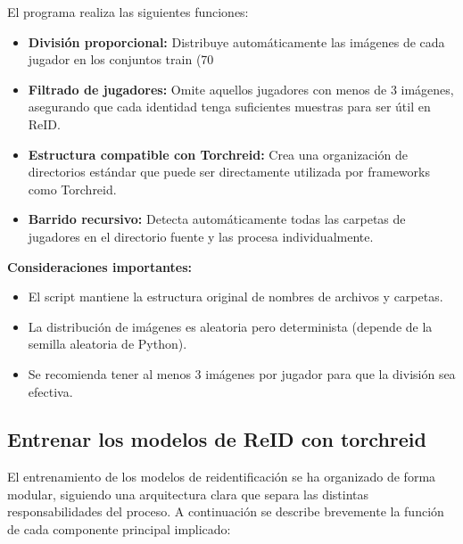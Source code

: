 \documentclass[12pt, a4paper, twoside]{article}
\begin{document}
	El programa realiza las siguientes funciones:
	
	\begin{itemize}
		\item \textbf{División proporcional:} Distribuye automáticamente las imágenes de cada jugador en los conjuntos train (70%
		\item \textbf{Filtrado de jugadores:} Omite aquellos jugadores con menos de 3 imágenes, asegurando que cada identidad tenga suficientes muestras para ser útil en ReID.
		\item \textbf{Estructura compatible con Torchreid:} Crea una organización de directorios estándar que puede ser directamente utilizada por frameworks como Torchreid.
		\item \textbf{Barrido recursivo:} Detecta automáticamente todas las carpetas de jugadores en el directorio fuente y las procesa individualmente.
	\end{itemize}
	
	\textbf{Consideraciones importantes:}
	\begin{itemize}
		\item El script mantiene la estructura original de nombres de archivos y carpetas.
		\item La distribución de imágenes es aleatoria pero determinista (depende de la semilla aleatoria de Python).
		\item Se recomienda tener al menos 3 imágenes por jugador para que la división sea efectiva.
	\end{itemize}
	
	
	
	\subsection{Entrenar los modelos de ReID con torchreid}
	
	El entrenamiento de los modelos de reidentificación se ha organizado de forma modular, siguiendo una arquitectura clara que separa las distintas responsabilidades del proceso. A continuación se describe brevemente la función de cada componente principal implicado:
	
\end{document}
